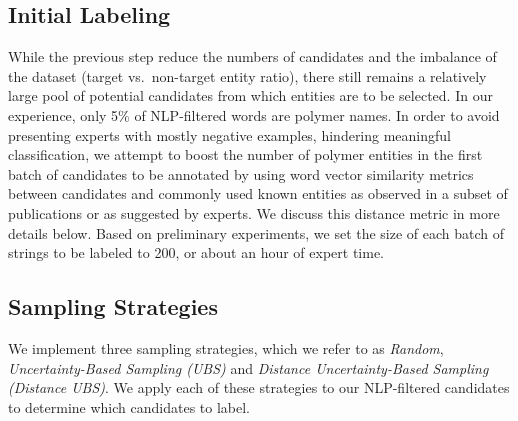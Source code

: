 \subsection{Initial Labeling}
While the previous step%
 reduce the numbers of candidates and the imbalance of the dataset (target vs.\ non-target entity ratio), 
 there still remains a relatively large pool of potential candidates from which entities are to be selected.
In our experience, only 5\% of NLP-filtered words are polymer names.
In order to avoid presenting experts with mostly negative examples, hindering meaningful classification,
we attempt to boost the number of polymer entities in the first batch of candidates to be annotated by using word vector similarity metrics between candidates and commonly used known entities as observed in a subset of publications or as suggested by experts.
We discuss this distance metric in more details below.
Based on preliminary experiments, we set the size of each batch of strings to be labeled to 200, 
or about an hour of expert time.

\subsection{Sampling Strategies}
We implement three sampling strategies, which we refer to as \textit{Random}, \textit{Uncertainty-Based Sampling (UBS)} and \textit{Distance Uncertainty-Based Sampling (Distance UBS)}.
We apply each of these strategies to our NLP-filtered candidates to determine which candidates to label.

